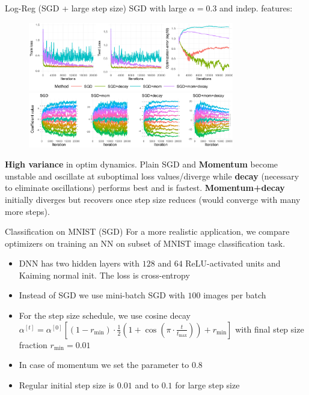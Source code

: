 \documentclass[11pt,compress,t,notes=noshow, xcolor=table]{beamer}
\begin{document}
\begin{vbframe}{Log-Reg (SGD + large step size)}
\vspace{-0.4cm}
SGD with large $\alpha=0.3$ and indep. features:
\begin{figure}
            \includegraphics[width=0.8\textwidth]{figure_man/simu_linmod/SGD_log_large_lr_iters.pdf} \\
             \includegraphics[width=0.8\textwidth]{figure_man/simu_linmod/SGD_log_coef_large.pdf}\\
            \begin{footnotesize}
            \end{footnotesize}
\end{figure}
\vspace{-0.2cm}
{\footnotesize
\textbf{High variance} in optim dynamics. Plain SGD and \textbf{Momentum} become unstable and oscillate at suboptimal loss values/diverge while \textbf{decay} (necessary to eliminate oscillations) performs best and is fastest. \textbf{Momentum+decay} initially diverges but recovers once step size reduces (would converge with many more steps).}
\end{vbframe}


\begin{vbframe}{Classification on MNIST (SGD)}
For a more realistic application, we compare optimizers on training an NN on subset of MNIST image classification task. 
\medskip
\begin{itemize}
     \setlength{\itemsep}{1.2em} 
    \item DNN has two hidden layers with $128$ and $64$ ReLU-activated units and Kaiming normal init. The loss is cross-entropy
    \item Instead of SGD we use mini-batch SGD with $100$ images per batch
    \item For the step size schedule, we use cosine decay $\alpha^{[t]} = \alpha^{[0]} \left[(1-r_{\text{min}}) \cdot \frac{1}{2}\left(1 + \cos\left(\pi \cdot \frac{t}{t_{\text{max}}}\right)\right) + r_{\text{min}}\right]$ with final step size fraction $r_{\text{min}}=0.01$
    \item In case of momentum we set the parameter to $0.8$
    \item Regular initial step size is $0.01$ and to $0.1$ for large step size
\end{itemize}
\end{vbframe}
\end{document}
